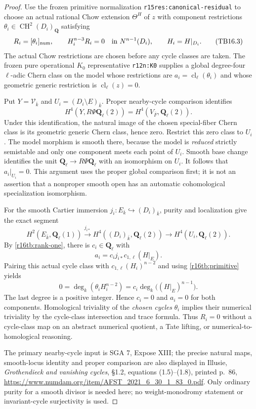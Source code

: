 \begin{proof}
Use the frozen primitive normalization
\texttt{r15res:canonical-residual} to choose an actual rational
Chow extension $\Theta^H$ of $z$ with component restrictions
$\theta_i\in\operatorname{CH}^2(D_i)_{\mathbf Q}$ satisfying
\[
 R_i=[\theta_i]_{\rm num},\qquad
             H_i^{n-3}R_i=0\quad\hbox{in }N^{n-1}(D_i),
             \qquad H_i=H|_{D_i}.
 \tag{TB16.3}\label{r16tb:primitive}
\]
The actual Chow restrictions are chosen before any cycle classes
are taken. The frozen pure operational $K_0$ representative
\texttt{r12n:K0} supplies a global degree-four $\ell$-adic
Chern class on the model whose restrictions are
$a_i=\operatorname{cl}_\ell(\theta_i)$ and whose geometric
generic restriction is $\operatorname{cl}_\ell(z)=0$.

Put $Y=\mathcal V_{\bar k}$ and $U_i=(D_i\setminus E)_{\bar k}$.
Proper nearby-cycle comparison identifies
\[
 H^4(Y,R\Psi\mathbf Q_\ell(2))
                      =H^4(V_{\bar F},\mathbf Q_\ell(2)).
\]
Under this identification, the natural image of the chosen
special-fiber Chern class is its geometric generic Chern class,
hence zero. Restrict this zero class to $U_i$.
The model morphism is smooth there, because the model is
\emph{reduced} strictly semistable and only one component meets
each point of $U_i$. Smooth base change identifies the unit
$\mathbf Q_\ell\to R\Psi\mathbf Q_\ell$ with an isomorphism
on $U_i$. It follows that $a_i|_{U_i}=0$.
This argument uses the proper global comparison first; it is
not an assertion that a nonproper smooth open has an automatic
cohomological specialization isomorphism.

For the smooth Cartier immersion $j_i:E_{\bar k}\hookrightarrow
(D_i)_{\bar k}$, purity and localization give the exact segment
\[
 H^2(E_{\bar k},\mathbf Q_\ell(1))
 \xrightarrow{j_{i*}}H^4((D_i)_{\bar k},\mathbf Q_\ell(2))
 \longrightarrow H^4(U_i,\mathbf Q_\ell(2)).
\]
By \eqref{r16tb:rank-one}, there is $c_i\in\mathbf Q_\ell$ with
\[
             a_i=c_i j_{i*}c_{1,\ell}(H|_E).
 \tag{TB16.4}\label{r16tb:cohom-boundary}
\]
Pairing this actual cycle class with $c_{1,\ell}(H_i)^{n-2}$
and using \eqref{r16tb:primitive} yields
\[
 0=\deg_k(\theta_i H_i^{n-2})
             =c_i\deg_k\bigl((H|_E)^{n-1}\bigr).
 \tag{TB16.5}\label{r16tb:coefficient-zero}
\]
The last degree is a positive integer. Hence $c_i=0$ and
$a_i=0$ for both components. Homological triviality of the
\emph{chosen cycles} $\theta_i$ implies their numerical
triviality by the cycle-class intersection and trace formula.
Thus $R_i=0$ without a cycle-class map on an abstract numerical
quotient, a Tate lifting, or numerical-to-homological reasoning.

The primary nearby-cycle input is SGA 7, Expose XIII; the precise
natural maps, smooth-locus identity and proper comparison are
also displayed in Illusie, \emph{Grothendieck and vanishing cycles},
\S1.2, equations (1.5)--(1.8), printed p.~86,
\url{https://www.numdam.org/item/AFST_2021_6_30_1_83_0.pdf}.
Only ordinary purity for a smooth divisor is needed here; no
weight-monodromy statement or invariant-cycle surjectivity is used.
\end{proof}

